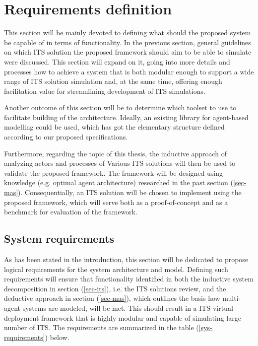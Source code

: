 \documentclass[main.tex]{subfiles}
\begin{document}
\section{Requirements definition}\label{sec-requirements}

This section will be mainly devoted to defining what should the proposed system be capable of in terms 
of functionality. In the previous section, general guidelines on which ITS solution the proposed 
framework should aim to be able to simulate were discussed. This section will expand on it, 
going into more details and processes how to achieve a system that is both modular enough to support 
a wide range of ITS solution simulation and, at the same time, offering enough facilitation value 
for streamlining development of ITS simulations. 

Another outcome of this section will be to determine which toolset to use to facilitate building of 
the architecture. Ideally, an existing library for agent-based modelling could be used, which has got 
the elementary structure defined according to our proposed specifications.

Furthermore, regarding the topic of this thesis, the inductive approach of analyzing actors and
processes of Various ITS solutions will then be used to validate the proposed framework. The
framework will be designed using knowledge (e.g. optimal agent architecture) researched in the
past section (\ref{sec-mas}). Consequentially, an ITS solution will be chosen to implement
using the proposed framework, which will serve both as a proof-of-concept and as a benchmark
for evaluation of the framework.  

\subsection{System requirements}

As has been stated in the introduction, this section will be dedicated to propose logical
requirements for the system architecture and model. Defining such requirements will ensure that
functionality identified in both the inductive system decomposition in section (\ref{sec-its}),
i.e. the ITS solutions review, and the deductive approach in section (\ref{sec-mas}), which 
outlines the basis how multi-agent systems are modeled, will be met. This should result 
in a ITS virtual-deployment framework that is highly modular and capable of simulating large 
number of ITS. The requirements are summarized in the table (\ref{sys-requirements}) below.
\end{document}
